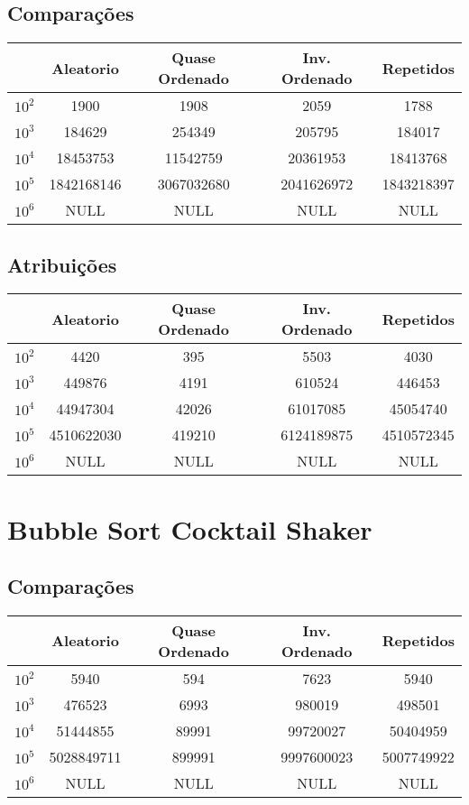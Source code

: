 \subsection{Comparações}
\begin{tabular}{|c|c|c|c|c|}
\hline
  & Aleatorio  & Quase Ordenado & Inv. Ordenado & Repetidos  \\
  \hline
$10^2$ & 1900       & 1908           & 2059          & 1788       \\
\hline
$10^3$ & 184629     & 254349         & 205795        & 184017     \\
\hline
$10^4$ & 18453753   & 11542759       & 20361953      & 18413768   \\
\hline
$10^5$ & 1842168146 & 3067032680     & 2041626972    & 1843218397 \\
\hline
$10^6$ & NULL       & NULL           & NULL          & NULL      \\
\hline
\end{tabular}
\subsection{Atribuições}
\begin{tabular}{|c|c|c|c|c|}
\hline
  & Aleatorio  & Quase Ordenado & Inv. Ordenado & Repetidos  \\
  \hline
$10^2$ & 4420       & 395            & 5503          & 4030       \\
\hline
$10^3$ & 449876     & 4191           & 610524        & 446453     \\
\hline
$10^4$ & 44947304   & 42026          & 61017085      & 45054740   \\
\hline
$10^5$ & 4510622030 & 419210         & 6124189875    & 4510572345 \\
\hline
$10^6$ & NULL       & NULL           & NULL          & NULL      \\
\hline
\end{tabular}


\section{Bubble Sort Cocktail Shaker}
\label{sec:cocktail}
\subsection{Comparações}
\begin{tabular}{|c|c|c|c|c|}
\hline
  & Aleatorio  & Quase Ordenado & Inv. Ordenado & Repetidos  \\
  \hline
$10^2$ & 5940       & 594            & 7623          & 5940       \\
\hline
$10^3$ & 476523     & 6993           & 980019        & 498501     \\
\hline
$10^4$ & 51444855   & 89991          & 99720027      & 50404959   \\
\hline
$10^5$ & 5028849711 & 899991         & 9997600023    & 5007749922 \\
\hline
$10^6$ & NULL       & NULL           & NULL          & NULL      \\
\hline
\end{tabular}
